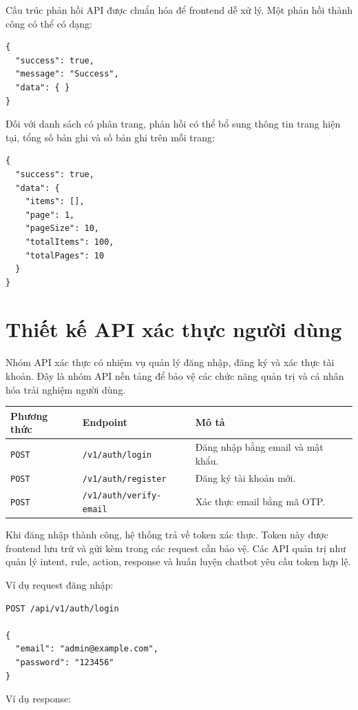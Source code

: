 \documentclass[12pt,a4paper]{report}
\begin{document}
Cấu trúc phản hồi API được chuẩn hóa để frontend dễ xử lý. Một phản hồi thành công có thể có dạng:

\begin{verbatim}
{
  "success": true,
  "message": "Success",
  "data": { }
}
\end{verbatim}

Đối với danh sách có phân trang, phản hồi có thể bổ sung thông tin trang hiện tại, tổng số bản ghi và số bản ghi trên mỗi trang:

\begin{verbatim}
{
  "success": true,
  "data": {
    "items": [],
    "page": 1,
    "pageSize": 10,
    "totalItems": 100,
    "totalPages": 10
  }
}
\end{verbatim}

\section{Thiết kế API xác thực người dùng}

Nhóm API xác thực có nhiệm vụ quản lý đăng nhập, đăng ký và xác thực tài khoản. Đây là nhóm API nền tảng để bảo vệ các chức năng quản trị và cá nhân hóa trải nghiệm người dùng.

\begin{longtable}{|p{3cm}|p{5cm}|p{7cm}|}
\hline
\textbf{Phương thức} & \textbf{Endpoint} & \textbf{Mô tả} \\
\hline
\texttt{POST} & \texttt{/v1/auth/login} & Đăng nhập bằng email và mật khẩu. \\
\hline
\texttt{POST} & \texttt{/v1/auth/register} & Đăng ký tài khoản mới. \\
\hline
\texttt{POST} & \texttt{/v1/auth/verify-email} & Xác thực email bằng mã OTP. \\
\hline
\end{longtable}

Khi đăng nhập thành công, hệ thống trả về token xác thực. Token này được frontend lưu trữ và gửi kèm trong các request cần bảo vệ. Các API quản trị như quản lý intent, rule, action, response và huấn luyện chatbot yêu cầu token hợp lệ.

Ví dụ request đăng nhập:

\begin{verbatim}
POST /api/v1/auth/login

{
  "email": "admin@example.com",
  "password": "123456"
}
\end{verbatim}

Ví dụ response:
\end{document}
